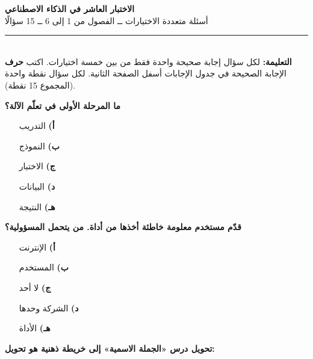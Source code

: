 \documentclass[11pt,a4paper]{article}
\begin{document}
\begin{center}
{\Large\khatt\textbf{الاختبار العاشر في الذكاء الاصطناعي}}\\[2pt]
{\normalsize أسئلة متعددة الاختيارات ــ الفصول من 1 إلى 6 ــ 15 سؤالًا}
\end{center}
\vspace{-4pt}\rule{\textwidth}{0.6pt}\\
{\small\textbf{التعليمة:} لكل سؤال إجابة صحيحة واحدة فقط من بين خمسة اختيارات.
اكتب \textbf{حرف} الإجابة الصحيحة في جدول الإجابات أسفل الصفحة الثانية.
لكل سؤال نقطة واحدة (المجموع 15 نقطة).}
\vspace{-2pt}
\begin{multicols}{2}

\noindent\begin{minipage}{\linewidth}
\hangindent=0.7cm\textbf{ما المرحلة الأولى في تعلّم الآلة؟}
\begin{itemize}[leftmargin=0.95cm, labelsep=4pt, itemsep=0pt, topsep=2pt, parsep=0pt]
  \item[\textbf{أ)}] التدريب
  \item[\textbf{ب)}] النموذج
  \item[\textbf{ج)}] الاختبار
  \item[\textbf{د)}] البيانات
  \item[\textbf{هـ)}] النتيجة
\end{itemize}
\end{minipage}\par\vspace{7pt plus 4pt}
\noindent\begin{minipage}{\linewidth}
\hangindent=0.7cm\textbf{قدّم مستخدم معلومة خاطئة أخذها من أداة. من يتحمل المسؤولية؟}
\begin{itemize}[leftmargin=0.95cm, labelsep=4pt, itemsep=0pt, topsep=2pt, parsep=0pt]
  \item[\textbf{أ)}] الإنترنت
  \item[\textbf{ب)}] المستخدم
  \item[\textbf{ج)}] لا أحد
  \item[\textbf{د)}] الشركة وحدها
  \item[\textbf{هـ)}] الأداة
\end{itemize}
\end{minipage}\par\vspace{7pt plus 4pt}
\noindent\begin{minipage}{\linewidth}
\hangindent=0.7cm\textbf{تحويل درس «الجملة الاسمية» إلى خريطة ذهنية هو تحويل:}

\end{minipage}
\end{multicols}
\end{document}
